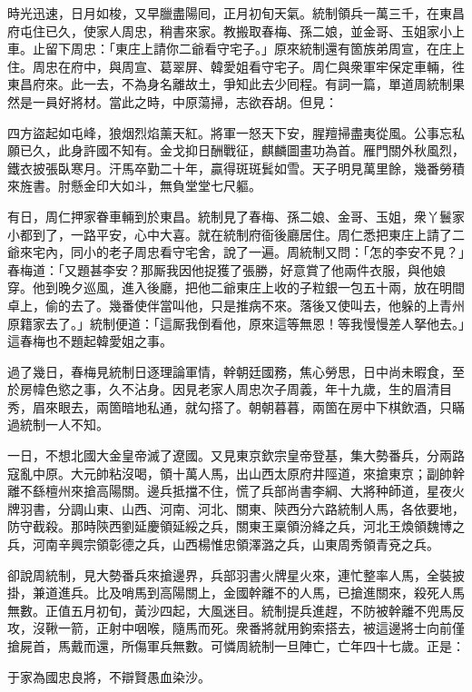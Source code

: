 時光迅速，日月如梭，又早臘盡陽囘，正月初旬天氣。統制領兵一萬三千，在東昌府屯住已久，使家人周忠，稍書來家。教搬取春梅、孫二娘，並金哥、玉姐家小上車。止留下周忠：「東庄上請你二爺看守宅子。」原來統制還有箇族弟周宣，在庄上住。周忠在府中，與周宣、葛翠屏、韓愛姐看守宅子。周仁與衆軍牢保定車輛，徃東昌府來。此一去，不為身名離故土，爭知此去少囘程。有詞一篇，單道周統制果然是一員好將材。當此之時，中原蕩掃，志欲吞胡。但見：

四方盜起如屯峰，狼烟烈焰薰天紅。將軍一怒天下安，腥羶掃盡夷從風。公事忘私願已久，此身許國不知有。{}金戈抑日酬戰征，麒麟圖畫功為首。雁門關外秋風烈，鐵衣披張臥寒月。汗馬卒勤二十年，贏得斑斑鬂如雪。天子明見萬里餘，幾番勞積來旌書。肘懸金印大如斗，無負堂堂七尺軀。

有日，周仁押家眷車輛到於東昌。統制見了春梅、孫二娘、金哥、玉姐，衆丫鬟家小都到了，一路平安，心中大喜。就在統制府衙後廳居住。周仁悉把東庄上請了二爺來宅內，同小的老子周忠看守宅舍，說了一遍。周統制又問：「怎的李安不見？」春梅道：「又題甚李安？那厮我因他捉獲了張勝，好意賞了他兩件衣服，與他娘穿。他到晚夕巡風，進入後廳，把他二爺東庄上收的子粒銀一包五十兩，放在明間卓上，偷的去了。幾番使伴當叫他，只是推病不來。落後又使叫去，他躲的上青州原籍家去了。」統制便道：「這厮我倒看他，原來這等無恩！等我慢慢差人拏他去。」這春梅也不題起韓愛姐之事。

過了幾日，春梅見統制日逐理論軍情，幹朝廷國務，焦心勞思，日中尚未暇食，至於房幃色慾之事，久不沾身。因見老家人周忠次子周義，年十九歲，生的眉清目秀，眉來眼去，兩箇暗地私通，就勾搭了。{}朝朝暮暮，兩箇在房中下棋飲酒，只瞞過統制一人不知。

一日，不想北國大金皇帝滅了遼國。又見東京欽宗皇帝登基，集大勢番兵，分兩路寇亂中原。大元帥粘沒喝，領十萬人馬，出山西太原府井陘道，來搶東京；副帥幹離不繇檀州來搶高陽關。邊兵抵擋不住，慌了兵部尚書李綱、大將种師道，星夜火牌羽書，分調山東、山西、河南、河北、關東、陝西分六路統制人馬，各依要地，防守截殺。那時陝西劉延慶領延綏之兵，關東王稟領汾絳之兵，河北王煥領魏博之兵，河南辛興宗領彰德之兵，山西楊惟忠領澤潞之兵，山東周秀領青兗之兵。

卻說周統制，見大勢番兵來搶邊界，兵部羽書火牌星火來，連忙整率人馬，全裝披掛，兼道進兵。比及哨馬到高陽關上，金國幹離不的人馬，已搶進關來，殺死人馬無數。正值五月初旬，黃沙四起，大風迷目。統制提兵進趕，不防被幹離不兜馬反攻，沒鞦一箭，正射中咽喉，隨馬而死。衆番將就用鉤索搭去，被這邊將士向前僅搶屍首，馬戴而還，所傷軍兵無數。可憐周統制一旦陣亡，亡年四十七歲。正是：

于家為國忠良將，不辯賢愚血染沙。

